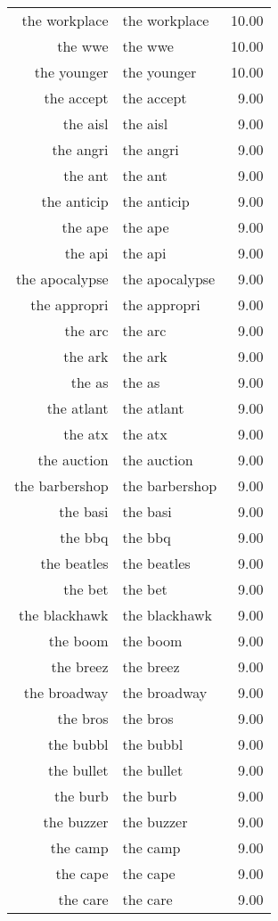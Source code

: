 \begin{table}[ht]
\begin{tabular}{rlr}
  the workplace & the workplace & 10.00 \\ 
  the wwe & the wwe & 10.00 \\ 
  the younger & the younger & 10.00 \\ 
  the accept & the accept & 9.00 \\ 
  the aisl & the aisl & 9.00 \\ 
  the angri & the angri & 9.00 \\ 
  the ant & the ant & 9.00 \\ 
  the anticip & the anticip & 9.00 \\ 
  the ape & the ape & 9.00 \\ 
  the api & the api & 9.00 \\ 
  the apocalypse & the apocalypse & 9.00 \\ 
  the appropri & the appropri & 9.00 \\ 
  the arc & the arc & 9.00 \\ 
  the ark & the ark & 9.00 \\ 
  the as & the as & 9.00 \\ 
  the atlant & the atlant & 9.00 \\ 
  the atx & the atx & 9.00 \\ 
  the auction & the auction & 9.00 \\ 
  the barbershop & the barbershop & 9.00 \\ 
  the basi & the basi & 9.00 \\ 
  the bbq & the bbq & 9.00 \\ 
  the beatles & the beatles & 9.00 \\ 
  the bet & the bet & 9.00 \\ 
  the blackhawk & the blackhawk & 9.00 \\ 
  the boom & the boom & 9.00 \\ 
  the breez & the breez & 9.00 \\ 
  the broadway & the broadway & 9.00 \\ 
  the bros & the bros & 9.00 \\ 
  the bubbl & the bubbl & 9.00 \\ 
  the bullet & the bullet & 9.00 \\ 
  the burb & the burb & 9.00 \\ 
  the buzzer & the buzzer & 9.00 \\ 
  the camp & the camp & 9.00 \\ 
  the cape & the cape & 9.00 \\ 
  the care & the care & 9.00 \\ 

\end{tabular}
\end{table}
